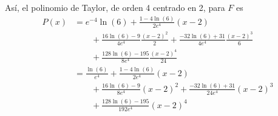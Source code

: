 \documentclass{article}
\begin{document}
  Así, el polinomio de Taylor, de orden 4 centrado en 2, para \(F\) es
  \begin{align}
    P(x)
    &=
    e^{- 4} \ln(6)
    + \frac{1 - 4 \ln(6)}{2 e^4} 
      (x - 2)
    \\
    &\qquad
    + \frac{16 \ln(6) - 9}{4 e^4} 
      \frac{(x - 2)^2}{2}
    + \frac{- 32 \ln(6) + 31}{4 e^4}
      \frac{(x - 2)^3}{6}
    \\
    &\qquad
    + \frac{128 \ln(6) - 195}{8 e^4}
      \frac{(x - 2)^4}{24}
    \\
    &=
    \frac{\ln(6)}{e^4}
    + \frac{1 - 4 \ln(6)}{2 e^4} 
      (x - 2)
    \\
    &\qquad
    + \frac{16 \ln(6) - 9}{8 e^4} 
      (x - 2)^2
    + \frac{- 32 \ln(6) + 31}{24 e^4}
      (x - 2)^3
    \\
    &\qquad
    + \frac{128 \ln(6) - 195}{192 e^4}
      (x - 2)^4
  \end{align}
\end{document}
